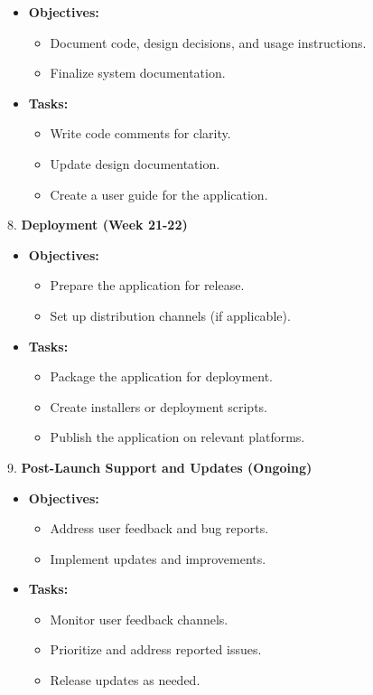 \documentclass[
]{article}
\begin{document}
\begin{itemize}
\item
  \textbf{Objectives:}

  \begin{itemize}
  \item
    Document code, design decisions, and usage instructions.
  \item
    Finalize system documentation.
  \end{itemize}
\item
  \textbf{Tasks:}

  \begin{itemize}
  \item
    Write code comments for clarity.
  \item
    Update design documentation.
  \item
    Create a user guide for the application.
  \end{itemize}
\end{itemize}

8. \textbf{Deployment (Week 21-22)}

\begin{itemize}
\item
  \textbf{Objectives:}

  \begin{itemize}
  \item
    Prepare the application for release.
  \item
    Set up distribution channels (if applicable).
  \end{itemize}
\item
  \textbf{Tasks:}

  \begin{itemize}
  \item
    Package the application for deployment.
  \item
    Create installers or deployment scripts.
  \item
    Publish the application on relevant platforms.
  \end{itemize}
\end{itemize}

9. \textbf{Post-Launch Support and Updates (Ongoing)}

\begin{itemize}
\item
  \textbf{Objectives:}

  \begin{itemize}
  \item
    Address user feedback and bug reports.
  \item
    Implement updates and improvements.
  \end{itemize}
\item
  \textbf{Tasks:}

  \begin{itemize}
  \item
    Monitor user feedback channels.
  \item
    Prioritize and address reported issues.
  \item
    Release updates as needed.
  \end{itemize}
\end{itemize}
\end{document}
